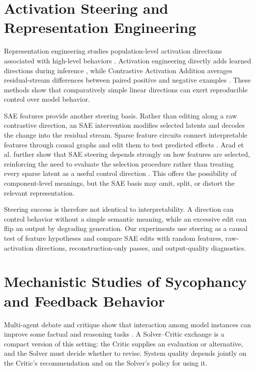 \section{Activation Steering and Representation Engineering}

Representation engineering studies population-level activation directions associated with high-level behaviors \cite{zou2023representation}. Activation engineering directly adds learned directions during inference \cite{turner2023activation}, while Contrastive Activation Addition averages residual-stream differences between paired positive and negative examples \cite{panickssery2023caa}. These methods show that comparatively simple linear directions can exert reproducible control over model behavior.

SAE features provide another steering basis. Rather than editing along a raw contrastive direction, an SAE intervention modifies selected latents and decodes the change into the residual stream. Sparse feature circuits connect interpretable features through causal graphs and edit them to test predicted effects \cite{marks2025circuits}. Arad et al. further show that SAE steering depends strongly on how features are selected, reinforcing the need to evaluate the selection procedure rather than treating every sparse latent as a useful control direction \cite{arad2025steering}. This offers the possibility of component-level meanings, but the SAE basis may omit, split, or distort the relevant representation.

Steering success is therefore not identical to interpretability. A direction can control behavior without a simple semantic meaning, while an excessive edit can flip an output by degrading generation. Our experiments use steering as a causal test of feature hypotheses and compare SAE edits with random features, raw-activation directions, reconstruction-only passes, and output-quality diagnostics.

\section{Mechanistic Studies of Sycophancy and Feedback Behavior}

Multi-agent debate and critique show that interaction among model instances can improve some factual and reasoning tasks \cite{du2024debate}. A Solver--Critic exchange is a compact version of this setting: the Critic supplies an evaluation or alternative, and the Solver must decide whether to revise. System quality depends jointly on the Critic's recommendation and on the Solver's policy for using it.

